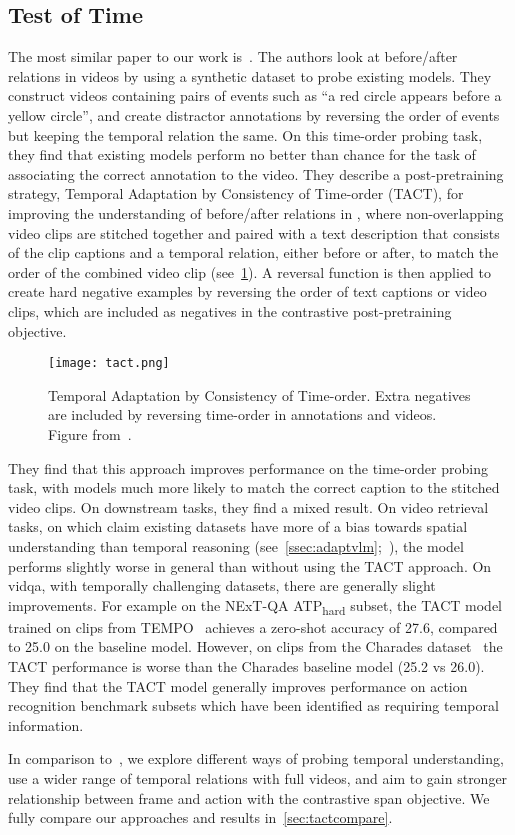 \subsection{Test of Time}
\label{ssec:testoftime}
The most similar paper to our work is~\cite{bagad2023testoftime}. The authors
look at before/after relations in videos by using a synthetic dataset to
probe existing models. They construct videos containing pairs of events such
as ``a red circle appears before a yellow circle'', and create distractor
annotations by reversing the order of events but keeping the temporal relation
the same. On this time-order probing task, they find that existing models
perform no better than chance for the task of associating the correct
annotation to the video. They describe a post-pretraining strategy, Temporal
Adaptation by Consistency of Time-order (TACT), for improving the understanding
of before/after relations in , where non-overlapping video
clips are stitched together and paired with a text description that consists of
the clip captions and a temporal relation, either before or after, to match the
order of the combined video clip (see~\cref{fig:tact}). A reversal function is
then applied to create hard negative examples by reversing the order of text
captions or video clips, which are included as negatives in the contrastive
post-pretraining objective.

\begin{figure}[t]
	\centering
	\texttt{[image: tact.png]}
	\caption{Temporal Adaptation by Consistency of Time-order. Extra negatives
	are included by reversing time-order in annotations and videos. Figure
	from~\citet{bagad2023testoftime}.}
	\label{fig:tact}
\end{figure}

They find that this approach improves performance on the time-order probing
task, with models much more likely to match the correct caption to the stitched
video clips. On downstream tasks, they find a mixed result. On video retrieval
tasks, on which claim existing datasets have more of a bias towards spatial
understanding than temporal reasoning
(see~\cref{ssec:adaptvlm};~\citet{buch2022revisiting,lei2023revealing,luo2022clip4clip}),
the model performs slightly worse in general than without using the TACT
approach. On \acrlong{vidqa}, with temporally challenging datasets, there are
generally slight improvements. For example on the NExT-QA
ATP\textsubscript{hard} subset, the TACT model trained on clips from
TEMPO~\citep{hendricks2018tempo} achieves a zero-shot accuracy of 27.6,
compared to 25.0 on the baseline model.  However, on clips from the Charades
dataset~\citep{sigurdsson2016charades} the TACT performance is worse than the
Charades baseline model (25.2 vs 26.0). They find that the TACT model generally
improves performance on action recognition benchmark subsets which have been
identified as requiring temporal information. 

In comparison to~\cite{bagad2023testoftime}, we explore different ways of
probing temporal understanding, use a wider range of temporal relations with
full videos, and aim to gain stronger relationship between frame and action
with the contrastive span objective. We fully compare our approaches and
results in~\cref{sec:tactcompare}.
